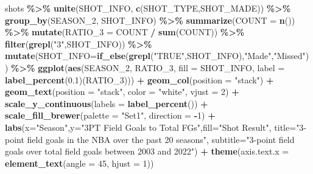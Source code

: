 \documentclass[
  12pt,
  a4paper,
]{article}
\newenvironment{Shaded}{\begin{snugshade}}{\end{snugshade}}
\newcommand{\AttributeTok}[1]{\textcolor[rgb]{0.13,0.29,0.53}{#1}}
\newcommand{\DecValTok}[1]{\textcolor[rgb]{0.00,0.00,0.81}{#1}}
\newcommand{\FloatTok}[1]{\textcolor[rgb]{0.00,0.00,0.81}{#1}}
\newcommand{\FunctionTok}[1]{\textcolor[rgb]{0.13,0.29,0.53}{\textbf{#1}}}
\newcommand{\NormalTok}[1]{#1}
\newcommand{\SpecialCharTok}[1]{\textcolor[rgb]{0.81,0.36,0.00}{\textbf{#1}}}
\newcommand{\StringTok}[1]{\textcolor[rgb]{0.31,0.60,0.02}{#1}}
\begin{document}
\begin{Shaded}
\begin{Highlighting}[]
\NormalTok{shots }\SpecialCharTok{\%\textgreater{}\%}
  \FunctionTok{unite}\NormalTok{(SHOT\_INFO, }\FunctionTok{c}\NormalTok{(SHOT\_TYPE,SHOT\_MADE)) }\SpecialCharTok{\%\textgreater{}\%} 
  \FunctionTok{group\_by}\NormalTok{(SEASON\_2, SHOT\_INFO) }\SpecialCharTok{\%\textgreater{}\%}
  \FunctionTok{summarize}\NormalTok{(}\AttributeTok{COUNT =} \FunctionTok{n}\NormalTok{()) }\SpecialCharTok{\%\textgreater{}\%}
  \FunctionTok{mutate}\NormalTok{(}\AttributeTok{RATIO\_3 =}\NormalTok{ COUNT }\SpecialCharTok{/} \FunctionTok{sum}\NormalTok{(COUNT)) }\SpecialCharTok{\%\textgreater{}\%}
  \FunctionTok{filter}\NormalTok{(}\FunctionTok{grepl}\NormalTok{(}\StringTok{"3"}\NormalTok{,SHOT\_INFO)) }\SpecialCharTok{\%\textgreater{}\%}
  \FunctionTok{mutate}\NormalTok{(}\AttributeTok{SHOT\_INFO=}\FunctionTok{if\_else}\NormalTok{(}\FunctionTok{grepl}\NormalTok{(}\StringTok{"TRUE"}\NormalTok{,SHOT\_INFO),}\StringTok{"Made"}\NormalTok{,}\StringTok{"Missed"}\NormalTok{)) }\SpecialCharTok{\%\textgreater{}\%}
  \FunctionTok{ggplot}\NormalTok{(}\FunctionTok{aes}\NormalTok{(SEASON\_2, RATIO\_3,}
         \AttributeTok{fill =}\NormalTok{ SHOT\_INFO, }\AttributeTok{label =} \FunctionTok{label\_percent}\NormalTok{(}\FloatTok{0.1}\NormalTok{)(RATIO\_3))) }\SpecialCharTok{+}
  \FunctionTok{geom\_col}\NormalTok{(}\AttributeTok{position =} \StringTok{"stack"}\NormalTok{) }\SpecialCharTok{+}
  \FunctionTok{geom\_text}\NormalTok{(}\AttributeTok{position =} \StringTok{"stack"}\NormalTok{, }\AttributeTok{color =} \StringTok{"white"}\NormalTok{, }\AttributeTok{vjust =} \DecValTok{2}\NormalTok{) }\SpecialCharTok{+}
  \FunctionTok{scale\_y\_continuous}\NormalTok{(}\AttributeTok{labels =} \FunctionTok{label\_percent}\NormalTok{()) }\SpecialCharTok{+}
  \FunctionTok{scale\_fill\_brewer}\NormalTok{(}\AttributeTok{palette =} \StringTok{"Set1"}\NormalTok{, }\AttributeTok{direction =} \SpecialCharTok{{-}}\DecValTok{1}\NormalTok{) }\SpecialCharTok{+}
  \FunctionTok{labs}\NormalTok{(}\AttributeTok{x=}\StringTok{"Season"}\NormalTok{,}\AttributeTok{y=}\StringTok{"3PT Field Goals to Total FGs"}\NormalTok{,}\AttributeTok{fill=}\StringTok{"Shot Result"}\NormalTok{,}
       \AttributeTok{title=}\StringTok{"3{-}point field goals in the NBA over the past 20 seasons"}\NormalTok{,}
       \AttributeTok{subtitle=}\StringTok{"3{-}point field goals over total}
\StringTok{                 field goals between 2003 and 2022"}\NormalTok{) }\SpecialCharTok{+}
  \FunctionTok{theme}\NormalTok{(}\AttributeTok{axis.text.x =} \FunctionTok{element\_text}\NormalTok{(}\AttributeTok{angle =} \DecValTok{45}\NormalTok{, }\AttributeTok{hjust =} \DecValTok{1}\NormalTok{))}


\end{Highlighting}
\end{Shaded}
\end{document}
